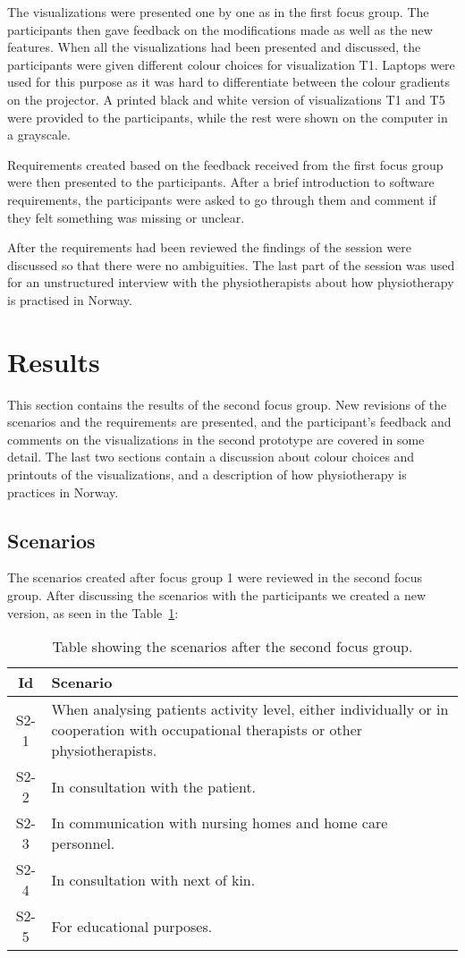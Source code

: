 The visualizations were presented one by one as in the first focus group. The participants then gave feedback on the modifications made as well as the new features. When all the visualizations had been presented and discussed, the participants were given different colour choices for visualization T1. Laptops were used for this purpose as it was hard to differentiate between the colour gradients on the projector. A printed black and white version of visualizations T1 and T5 were provided to the participants, while the rest were shown on the computer in a grayscale.

Requirements created based on the feedback received from the first focus group were then presented to the participants. After a brief introduction to software requirements, the participants were asked to go through them and comment if they felt something was missing or unclear.

After the requirements had been reviewed the findings of the session were discussed so that there were no ambiguities. The last part of the session was used for an unstructured interview with the physiotherapists about how physiotherapy is practised in Norway. 

\section{Results}
This section contains the results of the second focus group. New revisions of the scenarios and the requirements are presented, and the participant's feedback and comments on the visualizations in the second prototype are covered in some detail. The last two sections contain a discussion about colour choices and printouts of the visualizations, and a description of how physiotherapy is practices in Norway.

\subsection{Scenarios}
The scenarios created after focus group 1 were reviewed in the second focus group. After discussing the scenarios with the participants we created a new version, as seen in the Table~\ref{tab:scen2}:

\begin{table}[h!]
  \centering
  \begin{tabular}{|c|p{9cm}|}
    \hline
    \textbf{Id} & \textbf{Scenario} \\ \hline
    S2-1 & When analysing patients activity level, either individually or in cooperation with occupational therapists or other physiotherapists. \\ \hline
    S2-2 & In consultation with the patient. \\ \hline
    S2-3 & In communication with nursing homes and home care personnel. \\ \hline
    S2-4 & In consultation with next of kin. \\ \hline
    S2-5 & For educational purposes. \\ \hline
  \end{tabular}
  \caption{Table showing the scenarios after the second focus group.}
  \label{tab:scen2}
\end{table}

